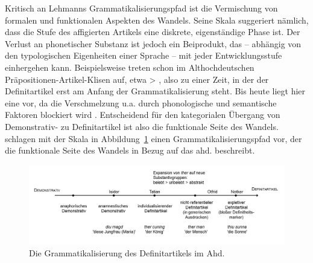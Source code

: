 Kritisch an Lehmanns Grammatikalisierungspfad ist die Vermischung von formalen und funktionalen Aspekten des Wandels. Seine Skala suggeriert nämlich, dass die Stufe des affigierten Artikels eine diskrete, eigenständige Phase ist. Der Verlust an phonetischer Substanz ist jedoch ein Beiprodukt, das -- abhängig von den typologischen Eigenheiten einer Sprache \parencite[vgl.][33]{Himmelmann2004} -- mit jeder Entwicklungsstufe einhergehen kann. Beispielsweise treten schon im  Althochdeutschen Präpositionen-Artikel-Klisen auf, etwa  >   \parencite{Schlachter2015}, also zu einer Zeit, in der der Definitartikel erst am Anfang der Grammatikalisierung steht. Bis heute liegt hier eine    \parencite{Nubling1992,Nubling2005} vor, da die Verschmelzung u.a. durch phonologische und semantische Faktoren blockiert wird \parencite[s. auch][91]{Szczepaniak2011a}.
Entscheidend für den kategorialen Übergang von Demonstrativ- zu Definitartikel ist also die funktionale Seite des Wandels. \textcite{Schmuck2014} schlagen mit der Skala in Abbildung~\ref{abb:schmuckszczep} \parencite[aufbauend auf][]{Lyons1999,Szczepaniak2011a} einen Grammatikalisierungspfad vor, der die funktionale Seite des Wandels in Bezug auf das ahd.   beschreibt. 

\begin{figure}
\includegraphics[width=\textwidth]{images/Grammatikalisierungspfad-schmuck-szczepaniak.jpg}
\caption {Die Grammatikalisierung des Definitartikels im Ahd. \parencite[102]{Schmuck2014}\label{abb:schmuckszczep}}
\end{figure}
 
